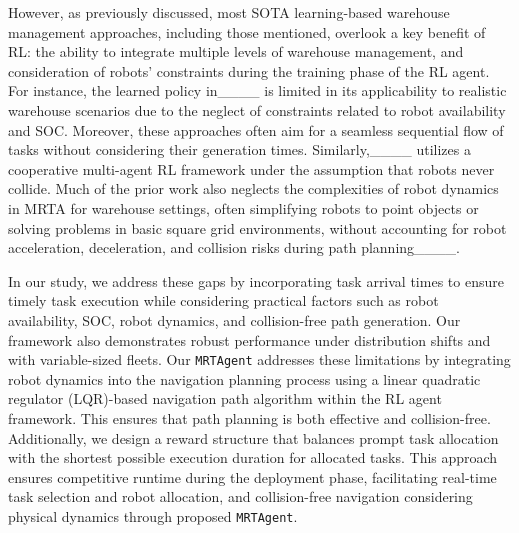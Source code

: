 However, as previously discussed, most SOTA learning-based warehouse management approaches, including those mentioned, overlook a key benefit of RL: the ability to integrate multiple levels of warehouse management, and consideration of robots' constraints during the training phase of the RL agent. For instance, the learned policy in____ is limited in its applicability to realistic warehouse scenarios due to the neglect of constraints related to robot availability and SOC. Moreover, these approaches often aim for a seamless sequential flow of tasks without considering their generation times. Similarly,____ utilizes a cooperative multi-agent RL framework under the assumption that robots never collide. Much of the prior work also neglects the complexities of robot dynamics in MRTA for warehouse settings, often simplifying robots to point objects or solving problems in basic square grid environments, without accounting for robot acceleration, deceleration, and collision risks during path planning____. %

In our study, we address these gaps by incorporating task arrival times to ensure timely task execution while considering practical factors such as robot availability, SOC, robot dynamics, and collision-free path generation. Our framework also demonstrates robust performance under distribution shifts and with variable-sized fleets. Our \texttt{MRTAgent} addresses these limitations by integrating robot dynamics into the navigation planning process using a linear quadratic regulator (LQR)-based navigation path algorithm within the RL agent framework. This ensures that path planning is both effective and collision-free.  Additionally, we design a reward structure that balances prompt task allocation with the shortest possible execution duration for allocated tasks. This approach ensures competitive runtime during the deployment phase, facilitating real-time task selection and robot allocation, and collision-free navigation considering physical dynamics through proposed \texttt{MRTAgent}.
